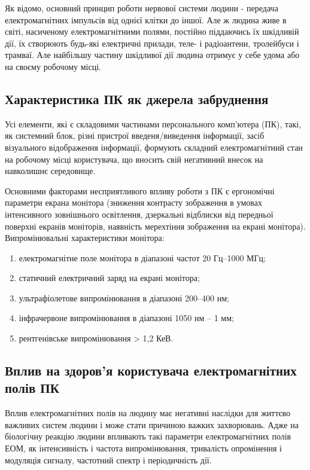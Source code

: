 Як відомо, основний принцип роботи нервової системи людини - передача електромагнітних імпульсів від однієї
 клітки до іншої. Але ж людина живе в світі, насиченому електромагнітними полями, постійно піддаючись їх 
шкідливій дії, їх створюють будь-які електричні прилади, теле- і радіоантени, тролейбуси і трамваї. Але 
найбільшу частину шкідливої дії людина отримує у себе удома або на своєму робочому місці.

\subsection{Характеристика ПК як джерела забруднення}

Усі елементи, які є складовими частинами персонального комп’ютера (ПК), такі, як системний блок, різні 
пристрої введеня/виведення інформації, засіб візуального відображення інформації, формують складний 
електромагнітний стан на робочому місці користувача, що вносить свій негативний внесок на навколишнє 
середовище.

Основними факторами  несприятливого  впливу  роботи  з  ПК є ергономічні параметри екрана монітора 
(зниження   контрасту   зображення   в   умовах   інтенсивного   зовнішнього освітлення, дзеркальні 
відблиски від передньої поверхні екранів моніторів, наявність мерехтіння зображення на екрані монітора). 
Випромінювальні характеристики монітора:

\begin{enumerate}
\item електромагнітне поле монітора в діапазоні частот 20 Гц--1000 МГц;
\item статичний електричний заряд на екрані монітора;
\item ультрафіолетове випромінювання в діапазоні 200--400 нм;
\item інфрачервоне випромінювання в діапазоні 1050 нм -- 1 мм;
\item рентгенівське випромінювання > 1,2 КеВ.
\end{enumerate}


\subsection{Вплив на здоров'я користувача електромагнітних полів ПК}

Вплив електромагнітних полів на людину має негативні наслідки для життєво важливих систем людини і 
може стати причиною важких захворювань. Адже на біологічну реакцію людини впливають такі параметри 
електромагнітних полів ЕОМ, як інтенсивність і частота випромінювання, тривалість опромінення і модуляція
 сигналу, частотний спектр і періодичність дії.


